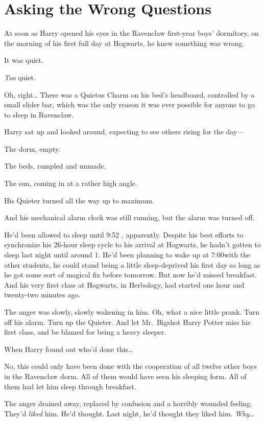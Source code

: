 \chapter{Asking the Wrong Questions}

\lettrine{A}{s} soon as Harry opened his eyes in the Ravenclaw first-year boys' dormitory, 
on the morning of his first full day at Hogwarts, he knew something was wrong.

It was quiet.

\emph{Too} quiet.

Oh, right{\ldots} There was a Quietus Charm on his bed's headboard, controlled 
by a small slider bar, which was the only reason it was ever possible for 
anyone to go to sleep in Ravenclaw.

Harry sat up and looked around, expecting to see others rising for the day---

The dorm, empty.

The beds, rumpled and unmade.

The sun, coming in at a rather high angle.

His Quieter turned all the way up to maximum.

And his mechanical alarm clock was still running, but the alarm was turned off.

He'd been allowed to sleep until 9:52 \AM, apparently. Despite his best efforts 
to synchronize his 26-hour sleep cycle to his arrival at Hogwarts, he hadn't 
gotten to sleep last night until around 1\AM. He'd been planning to wake up at 
7:00\AM with the other students, he could stand being a little sleep-deprived 
his first day so long as he got some sort of magical fix before tomorrow. But 
now he'd missed breakfast. And his very first class at Hogwarts, in Herbology, 
had started one hour and twenty-two minutes ago.

The anger was slowly, slowly wakening in him. Oh, what a nice little prank. 
Turn off his alarm. Turn up the Quieter. And let Mr.~Bigshot Harry Potter miss 
his first class, and be blamed for being a heavy sleeper.

When Harry found out who'd done this{\ldots}

No, this could only have been done with the cooperation of all twelve other 
boys in the Ravenclaw dorm. All of them would have seen his sleeping form. All 
of them had let him sleep through breakfast.

The anger drained away, replaced by confusion and a horribly wounded feeling. 
They'd \emph{liked} him. He'd thought. Last night, he'd thought they liked him. 
\emph{Why{\ldots}}

